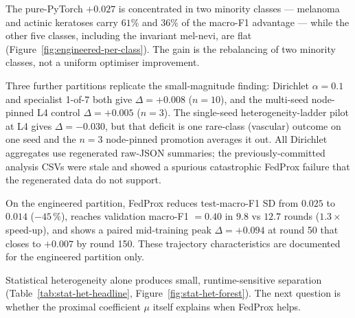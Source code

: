 \documentclass[11pt,a4paper]{report}
\begin{document}
The pure-PyTorch $+0.027$ is concentrated in two minority classes --- melanoma
and actinic keratoses carry $61\%$ and $36\%$ of the macro-F1 advantage --- while
the other five classes, including the invariant mel-nevi, are flat
(Figure~\ref{fig:engineered-per-class}). The gain is the rebalancing of two
minority classes, not a uniform optimiser improvement.

Three further partitions replicate the small-magnitude finding: Dirichlet
$\alpha = 0.1$ and specialist 1-of-7 both give $\Delta = +0.008$ ($n=10$), and
the multi-seed node-pinned L4 control $\Delta = +0.005$ ($n=3$). The single-seed
heterogeneity-ladder pilot at L4 gives $\Delta = -0.030$, but that deficit is one
rare-class (vascular) outcome on one seed and the $n=3$ node-pinned promotion
averages it out. All Dirichlet aggregates use regenerated raw-JSON summaries; the
previously-committed analysis CSVs were stale and showed a spurious catastrophic
FedProx failure that the regenerated data do not support.

On the engineered partition, FedProx reduces test-macro-F1 SD from $0.025$
to $0.014$ ($-45\,\%$), reaches validation macro-F1 $= 0.40$ in $9.8$ vs
$12.7$ rounds ($1.3\times$ speed-up), and shows a paired mid-training peak
$\Delta = +0.094$ at round 50 that closes to $+0.007$ by round 150. These
trajectory characteristics are documented for the engineered partition only.

Statistical heterogeneity alone produces small, runtime-sensitive separation
(Table~\ref{tab:stat-het-headline}, Figure~\ref{fig:stat-het-forest}). The
next question is whether the proximal coefficient $\mu$ itself explains when
FedProx helps.


\end{document}
